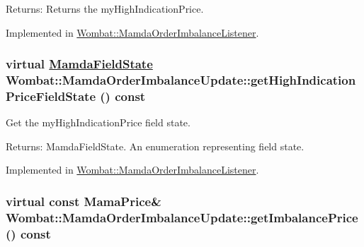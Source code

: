 \begin{Desc}
\item[Returns:]Returns the my\-High\-Indication\-Price. \end{Desc}


Implemented in \hyperlink{classWombat_1_1MamdaOrderImbalanceListener_596c5c1e351924b74e0f81af784a45a1}{Wombat::Mamda\-Order\-Imbalance\-Listener}.\hypertarget{classWombat_1_1MamdaOrderImbalanceUpdate_62190442d565a91c1712856f028bc6c8}{
\subsubsection[getHighIndicationPriceFieldState]{\setlength{\rightskip}{0pt plus 5cm}virtual \hyperlink{namespaceWombat_93aac974f2ab713554fd12a1fa3b7d2a}{Mamda\-Field\-State} Wombat::Mamda\-Order\-Imbalance\-Update::get\-High\-Indication\-Price\-Field\-State () const}}
\label{classWombat_1_1MamdaOrderImbalanceUpdate_62190442d565a91c1712856f028bc6c8}


Get the my\-High\-Indication\-Price field state. 

\begin{Desc}
\item[Returns:]Mamda\-Field\-State. An enumeration representing field state. \end{Desc}


Implemented in \hyperlink{classWombat_1_1MamdaOrderImbalanceListener_6272673c1cf08580d09ec73d0e458734}{Wombat::Mamda\-Order\-Imbalance\-Listener}.\hypertarget{classWombat_1_1MamdaOrderImbalanceUpdate_9ac691e50c0a93178578d1225c88f784}{
\subsubsection[getImbalancePrice]{\setlength{\rightskip}{0pt plus 5cm}virtual const Mama\-Price\& Wombat::Mamda\-Order\-Imbalance\-Update::get\-Imbalance\-Price () const}}
\label{classWombat_1_1MamdaOrderImbalanceUpdate_9ac691e50c0a93178578d1225c88f784}


